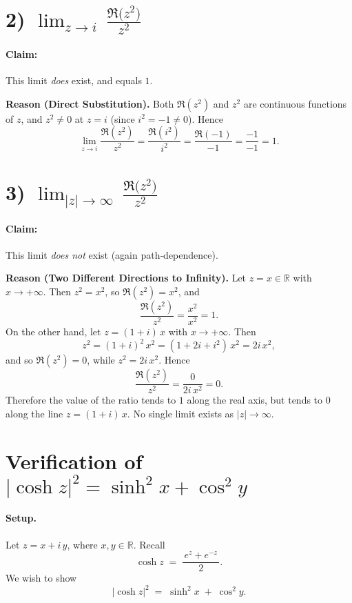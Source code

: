 \documentclass[12pt]{article}
\theoremstyle{definition} %
\theoremstyle{plain} %
\begin{document}
\bigskip

\section*{2) \; $\displaystyle \lim_{z \to i}\,\frac{\Re\bigl(z^2\bigr)}{z^2}$}

\paragraph{Claim:} This limit \emph{does} exist, and equals $1$.

\medskip
\noindent
\textbf{Reason (Direct Substitution).}
Both $\Re(z^2)$ and $z^2$ are continuous functions of $z$, and $z^2 \neq 0$ at $z=i$ (since $i^2=-1\neq 0$).  
Hence
\[
\lim_{z\to i} \frac{\Re(z^2)}{z^2}
= \frac{\Re(i^2)}{\,i^2\,}
= \frac{\Re(-1)}{-1}
= \frac{-1}{-1}
= 1.
\]

\bigskip

\section*{3) \; $\displaystyle \lim_{|z|\to \infty}\,\frac{\Re\bigl(z^2\bigr)}{z^2}$}

\paragraph{Claim:} This limit \emph{does not} exist (again path‐dependence).

\medskip
\noindent
\textbf{Reason (Two Different Directions to Infinity).}
Let $z = x \in \mathbb{R}$ with $x \to +\infty$. Then $z^2 = x^2$, so 
\(\Re(z^2) = x^2\), and 
\[
\frac{\Re(z^2)}{z^2} = \frac{x^2}{x^2} = 1.
\]
On the other hand, let $z = (1+i)\,x$ with $x \to +\infty$. Then
\[
z^2 = (1+i)^2\,x^2 = (1 + 2i + i^2)\,x^2 = 2i\,x^2,
\]
and so $\Re(z^2)=0$, while $z^2=2i\,x^2$. Hence
\[
\frac{\Re(z^2)}{z^2} = \frac{0}{2i\,x^2} = 0.
\]
Therefore the value of the ratio tends to $1$ along the real axis, but tends to $0$ along the line $z=(1+i)\,x$.  No single limit exists as $|z|\to\infty$.

\section*{Verification of $\bigl|\cosh z\bigr|^2 = \sinh^2 x + \cos^2 y$}

\paragraph{Setup.} Let $z = x + i\,y$, where $x,y \in \mathbb{R}$. Recall
\[
\cosh z \;=\; \frac{\,e^z + e^{-z}\,}{2}.
\]
We wish to show
\[
\bigl|\cosh z\bigr|^2
\;=\;
\sinh^2 x
\;+\;
\cos^2 y.
\]
\end{document}
